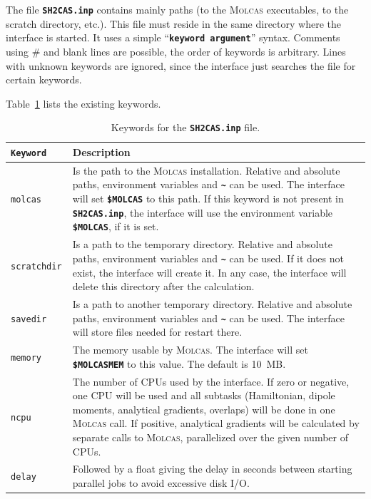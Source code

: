 \documentclass[a4paper,11pt,DIV=15,openany,twoside=false]{scrbook}
\newcommand{\ttt}[1]{\textbf{\texttt{#1}}}
\begin{document}
The file \ttt{SH2CAS.inp} contains mainly paths (to the \textsc{Molcas} executables, to the scratch directory, etc.). This file must reside in the same directory where the interface is started. It uses a simple ``\ttt{keyword argument}'' syntax. Comments using \# and blank lines are possible, the order of keywords is arbitrary. Lines with unknown keywords are ignored, since the interface just searches the file for certain keywords.

Table~\ref{tab:molcas_sh2} lists the existing keywords.

\begin{table}
  \centering
  \caption{Keywords for the \ttt{SH2CAS.inp} file.}
  \label{tab:molcas_sh2}
  \begin{tabular}{>{\tt}lp{12cm}}
  \toprule
  Keyword       &Description\\
  \midrule
molcas          &Is the path to the \textsc{Molcas} installation. Relative and absolute paths, environment variables and \ttt{\textasciitilde} can be used. The interface will set \ttt{\$MOLCAS} to this path. If this keyword is not present in \ttt{SH2CAS.inp}, the interface will use the environment variable \ttt{\$MOLCAS}, if it is set.\\
scratchdir      &Is a path to the temporary directory. Relative and absolute paths, environment variables and \ttt{\textasciitilde} can be used. If it does not exist, the interface will create it. In any case, the interface will delete this directory after the calculation.\\
savedir         &Is a path to another temporary directory.  Relative and absolute paths, environment variables and \ttt{\textasciitilde} can be used. The interface will store files needed for restart there.\\
memory          &The memory usable by \textsc{Molcas}. The interface will set \ttt{\$MOLCASMEM} to this value. The default is 10~MB.\\
ncpu            & The number of CPUs used by the interface. If zero or negative, one CPU will be used and all subtasks (Hamiltonian, dipole moments, analytical gradients, overlaps) will be done in one \textsc{Molcas} call. If positive, analytical gradients will be calculated by separate calls to \textsc{Molcas}, parallelized over the given number of CPUs. \\
delay           &Followed by a float giving the delay in seconds between starting parallel jobs to avoid excessive disk I/O.\\

\end{tabular}
\end{table}
\end{document}
